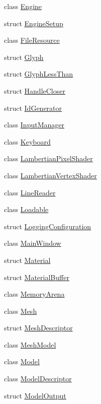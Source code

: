\begin{DoxyCompactItemize}
\item 
class \hyperlink{classmage_1_1_engine}{Engine}
\item 
struct \hyperlink{structmage_1_1_engine_setup}{Engine\+Setup}
\item 
class \hyperlink{classmage_1_1_file_resource}{File\+Resource}
\item 
struct \hyperlink{structmage_1_1_glyph}{Glyph}
\item 
struct \hyperlink{structmage_1_1_glyph_less_than}{Glyph\+Less\+Than}
\item 
struct \hyperlink{structmage_1_1_handle_closer}{Handle\+Closer}
\item 
struct \hyperlink{structmage_1_1_id_generator}{Id\+Generator}
\item 
class \hyperlink{classmage_1_1_input_manager}{Input\+Manager}
\item 
class \hyperlink{classmage_1_1_keyboard}{Keyboard}
\item 
class \hyperlink{classmage_1_1_lambertian_pixel_shader}{Lambertian\+Pixel\+Shader}
\item 
class \hyperlink{classmage_1_1_lambertian_vertex_shader}{Lambertian\+Vertex\+Shader}
\item 
class \hyperlink{classmage_1_1_line_reader}{Line\+Reader}
\item 
class \hyperlink{classmage_1_1_loadable}{Loadable}
\item 
struct \hyperlink{structmage_1_1_logging_configuration}{Logging\+Configuration}
\item 
class \hyperlink{classmage_1_1_main_window}{Main\+Window}
\item 
struct \hyperlink{structmage_1_1_material}{Material}
\item 
struct \hyperlink{structmage_1_1_material_buffer}{Material\+Buffer}
\item 
class \hyperlink{classmage_1_1_memory_arena}{Memory\+Arena}
\item 
class \hyperlink{classmage_1_1_mesh}{Mesh}
\item 
struct \hyperlink{structmage_1_1_mesh_descriptor}{Mesh\+Descriptor}
\item 
class \hyperlink{classmage_1_1_mesh_model}{Mesh\+Model}
\item 
class \hyperlink{classmage_1_1_model}{Model}
\item 
class \hyperlink{classmage_1_1_model_descriptor}{Model\+Descriptor}
\item 
struct \hyperlink{structmage_1_1_model_output}{Model\+Output}
\item 

\end{DoxyCompactItemize}
